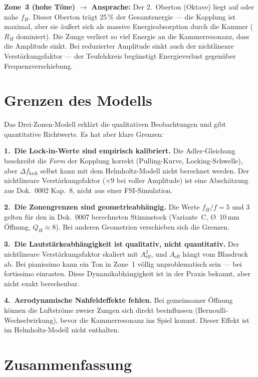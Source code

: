 \documentclass[11pt,a4paper]{article}
\begin{document}
\textbf{Zone~3 (hohe Töne) $\to$ Ansprache:} Der 2.~Oberton (Oktave) liegt auf oder nahe $f_H$. Dieser Oberton trägt 25\,\% der Gesamtenergie --- die Kopplung ist maximal, aber sie äußert sich als massive Energieabsorption durch die Kammer ($R_H$ dominiert). Die Zunge verliert so viel Energie an die Kammerresonanz, dass die Amplitude sinkt. Bei reduzierter Amplitude sinkt auch der nichtlineare Verstärkungsfaktor --- der Teufelskreis begünstigt Energieverlust gegenüber Frequenzverschiebung.

\section{Grenzen des Modells}

Das Drei-Zonen-Modell erklärt die qualitativen Beobachtungen und gibt quantitative Richtwerte. Es hat aber klare Grenzen:

\textbf{1.\ Die Lock-in-Werte sind empirisch kalibriert.} Die Adler-Gleichung beschreibt die \textit{Form} der Kopplung korrekt (Pulling-Kurve, Locking-Schwelle), aber $\Delta f_\text{lock}$ selbst kann mit dem Helmholtz-Modell nicht berechnet werden. Der nichtlineare Verstärkungsfaktor ($\times 9$ bei voller Amplitude) ist eine Abschätzung aus Dok.~0002 Kap.~8, nicht aus einer FSI-Simulation.

\textbf{2.\ Die Zonengrenzen sind geometrieabhängig.} Die Werte $f_H/f = 5$ und $3$ gelten für den in Dok.~0007 berechneten Stimmstock (Variante~C, \O{}~10\,mm Öffnung, $Q_H \approx 8$). Bei anderen Geometrien verschieben sich die Grenzen.

\textbf{3.\ Die Lautstärkeabhängigkeit ist qualitativ, nicht quantitativ.} Der nichtlineare Verstärkungsfaktor skaliert mit $A_\text{eff}^2$, und $A_\text{eff}$ hängt vom Blasdruck ab. Bei pianissimo kann ein Ton in Zone~1 völlig unproblematisch sein --- bei fortissimo einrasten. Diese Dynamikabhängigkeit ist in der Praxis bekannt, aber nicht exakt berechenbar.

\textbf{4.\ Aerodynamische Nahfeldeffekte fehlen.} Bei gemeinsamer Öffnung können die Luftströme zweier Zungen sich direkt beeinflussen (Bernoulli-Wechselwirkung), bevor die Kammerresonanz ins Spiel kommt. Dieser Effekt ist im Helmholtz-Modell nicht enthalten.

\section{Zusammenfassung}
\end{document}
